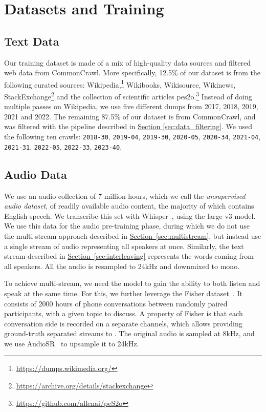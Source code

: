 \section{Datasets and Training}
\label{sec:maindatasets}

\subsection{Text Data}
\label{sec:text_dataset}
Our training dataset is made of a mix of high-quality data sources and filtered web data from CommonCrawl.
More specifically, 12.5\% of our dataset is from the following curated sources: Wikipedia,\footnote{\url{https://dumps.wikimedia.org/}} Wikibooks, Wikisource, Wikinews,
StackExchange\footnote{\url{https://archive.org/details/stackexchange}} and the collection of scientific articles pes2o.\footnote{\url{https://github.com/allenai/peS2o}}
Instead of doing multiple passes on Wikipedia, we use five different dumps from 2017, 2018, 2019, 2021 and 2022.
The remaining 87.5\% of our dataset is from CommonCrawl, and was filtered with the pipeline described in \hyperref[sec:data_filtering]{Section \ref{sec:data_filtering}}.
We used the following ten crawls: \texttt{2018-30}, \texttt{2019-04}, \texttt{2019-30}, \texttt{2020-05}, \texttt{2020-34}, \texttt{2021-04}, \texttt{2021-31}, \texttt{2022-05}, \texttt{2022-33}, \texttt{2023-40}.

\subsection{Audio Data}
\label{sec:audio_data}
We use an audio collection of 7 million hours, which we call the \emph{unsupervised audio dataset}, of readily available audio content, the majority
of which contains English speech. We transcribe this set with Whisper~\citep{whisper}, using the large-v3 model. We use this data for the audio pre-training phase, during which we do not use the multi-stream approach described in \hyperref[sec:multistream]{Section~\ref{sec:multistream}}, but instead use a single stream of audio representing all speakers at once. Similarly, the text stream described in \hyperref[sec:interleaving]{Section~\ref{sec:interleaving}} represents the words coming from all speakers. All the audio is resampled to 24kHz and downmixed to mono.

To achieve multi-stream, we need the model to gain the ability to both listen and speak at the same time. For this, we further leverage the Fisher dataset~\citep{cieri2004fisher}. It consists of 2000 hours of
phone conversations between randomly paired participants, with a given topic to discuss. A property of Fisher is that each conversation side is recorded on a separate channels, which allows providing ground-truth separated streams to \ours{}. The original audio is sampled at 8kHz, and we use AudioSR~\citep{liu2023audiosr} to upsample it to 24kHz.

